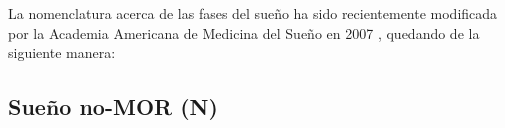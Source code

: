 

La nomenclatura acerca de las fases del sue\~no ha sido 
recientemente modificada por la Academia Americana de Medicina del Sueño en 2007 \cite{AASM07}, 
quedando de la siguiente manera:


\subsection{Sueño no-MOR (N)}

